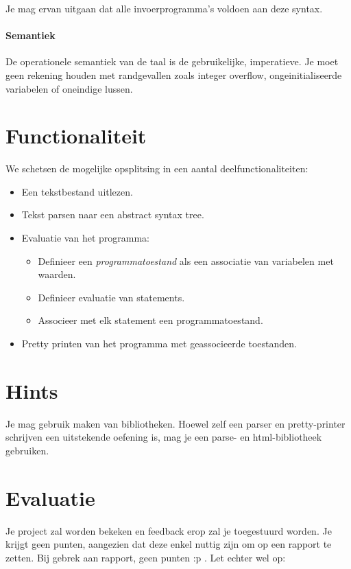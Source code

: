 \documentclass{article}
\begin{document}
Je mag ervan uitgaan dat alle invoerprogramma's voldoen aan deze
syntax.

\paragraph{Semantiek}
De operationele semantiek van de taal is de gebruikelijke, imperatieve. Je moet
geen rekening houden met randgevallen zoals integer overflow,
ongeinitialiseerde variabelen of oneindige lussen.
\section{Functionaliteit}

We schetsen de mogelijke opsplitsing in een aantal deelfunctionaliteiten:

\begin{itemize}
\item Een tekstbestand uitlezen.
\item Tekst parsen naar een abstract syntax tree.
\item Evaluatie van het programma:
   \begin{itemize}
   \item Definieer een \textit{programmatoestand} als een associatie van variabelen
         met waarden.
   \item Definieer evaluatie van statements.
   \item Associeer met elk statement een programmatoestand.
   \end{itemize}
\item Pretty printen van het programma met geassocieerde toestanden.
\end{itemize}

\section{Hints}

Je mag gebruik maken van bibliotheken. Hoewel zelf een parser en pretty-printer schrijven een uitstekende oefening is, mag je een parse- en html-bibliotheek gebruiken.

\section{Evaluatie}

Je project zal worden bekeken en feedback erop zal je toegestuurd worden. Je krijgt geen punten, aangezien dat deze enkel nuttig zijn om op een rapport te zetten. Bij gebrek aan rapport, geen punten :p . Let echter wel op:
\end{document}
